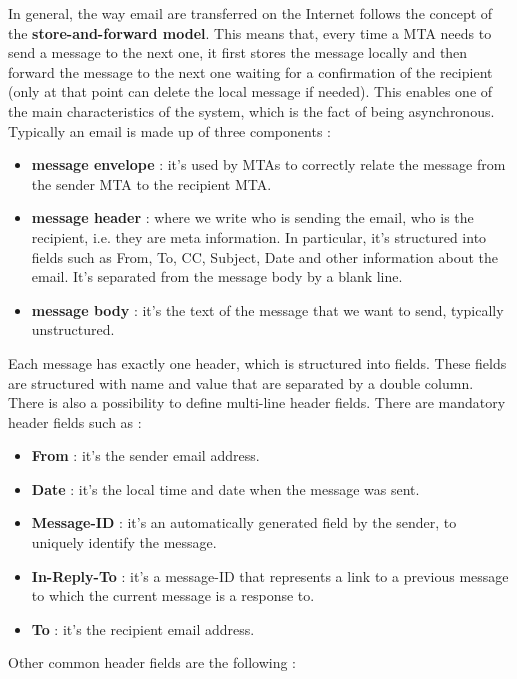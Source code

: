 In general, the way email are transferred on the Internet follows the concept of the \textbf{store-and-forward model}. This means that, every time a MTA needs to send a message to the next one, it first stores the message locally and then forward the message to the next one waiting for a confirmation of the recipient (only at that point can delete the local message if needed). This enables one of the main characteristics of the system, which is the fact of being asynchronous. Typically an email is made up of three components :
\begin{itemize}
\item \textbf{message envelope} : it's used by MTAs to correctly relate the message from the sender MTA to the recipient MTA.
\item \textbf{message header} : where we write who is sending the email, who is the recipient, i.e. they are meta information. In particular, it's structured into fields such as From, To, CC, Subject, Date and other information about the email. It's separated from the message body by a blank line.
\item \textbf{message body} : it's the text of the message that we want to send, typically unstructured.
\end{itemize}
Each message has exactly one header, which is structured into fields. These fields are structured with name and value that are separated by a double column. There is also a possibility to define multi-line header fields. There are mandatory header fields such as :
\begin{itemize}
\item \textbf{From} : it's the sender email address.
\item \textbf{Date} : it's the local time and date when the message was sent.
\item \textbf{Message-ID} : it's an automatically generated field by the sender, to uniquely identify the message.
\item \textbf{In-Reply-To} : it's a message-ID that represents a link to a previous message to which the current message is a response to.
\item \textbf{To} : it's the recipient email address.
\end{itemize}
Other common header fields are the following :
